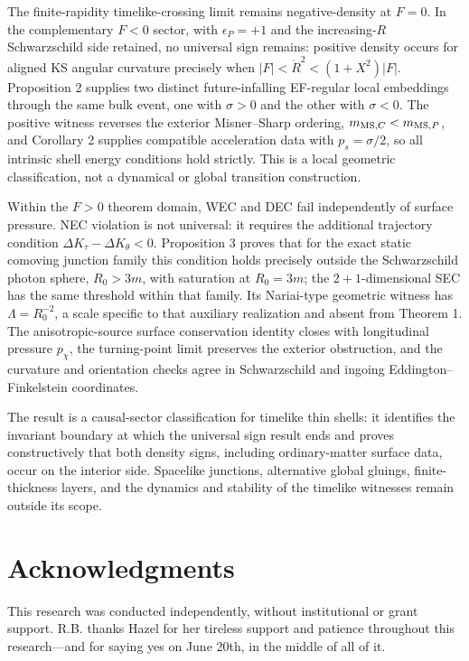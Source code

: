 \documentclass[pdflatex,sn-mathphys-num]{sn-jnl}
\begin{document}
The finite-rapidity timelike-crossing limit remains negative-density at \(F=0\). In the complementary \(F<0\) sector, with \(\epsilon_P=+1\) and the increasing-\(R\) Schwarzschild side retained, no universal sign remains: positive density occurs for aligned KS angular curvature precisely when \(|F|<\dot R^2<(1+X^2)|F|\). Proposition 2 supplies two distinct future-infalling EF-regular local embeddings through the same bulk event, one with \(\sigma>0\) and the other with \(\sigma<0\). The positive witness reverses the exterior Misner--Sharp ordering, \(m_{{\rm MS},C}<m_{{\rm MS},P}\), and Corollary 2 supplies compatible acceleration data with \(p_s=\sigma/2\), so all intrinsic shell energy conditions hold strictly. This is a local geometric classification, not a dynamical or global transition construction.


Within the \(F>0\) theorem domain, WEC and DEC fail independently of surface pressure. NEC violation is not universal: it requires the additional trajectory condition \(\Delta K_\tau-\Delta K_\theta<0\). Proposition 3 proves that for the exact static comoving junction family this condition holds precisely outside the Schwarzschild photon sphere, \(R_0>3m\), with saturation at \(R_0=3m\); the \(2+1\)-dimensional SEC has the same threshold within that family. Its Nariai-type geometric witness has \(\Lambda=R_0^{-2}\), a scale specific to that auxiliary realization and absent from Theorem 1. The anisotropic-source surface conservation identity closes with longitudinal pressure \(p_\chi\), the turning-point limit preserves the exterior obstruction, and the curvature and orientation checks agree in Schwarzschild and ingoing Eddington--Finkelstein coordinates.


The result is a causal-sector classification for timelike thin shells: it identifies the invariant boundary at which the universal sign result ends and proves constructively that both density signs, including ordinary-matter surface data, occur on the interior side. Spacelike junctions, alternative global gluings, finite-thickness layers, and the dynamics and stability of the timelike witnesses remain outside its scope.


\section*{Acknowledgments}

This research was conducted independently, without institutional or grant support. R.B. thanks Hazel for her tireless support and patience throughout this research---and for saying yes on June 20th, in the middle of all of it.
\end{document}
